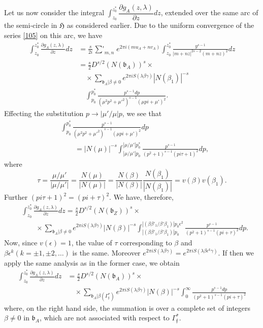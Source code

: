 Let us now consider the integral
$\int^{z^{\ast}_{0}}_{z_{0}}\dfrac{\partial g_{A}(z,\lambda)}{\partial
  z}dz$, extended over the same arc of the semi-circle in
$\mathfrak{H}$ as considered earlier. Due to the uniform convergence
of the series \eqref{105} on this arc, we have  
\begin{align*}
\int^{z^{\ast}_{0}}_{z_{0}}\frac{\partial g_{A}(z,\lambda)}{\partial
  z}dz &= \frac{s}{2i}\mathop{{\sum}'}_{m,n}e^{2\pi
  i(mu_{A}+nv_{A})}\int^{z^{\ast}_{0}}_{z_{0}}\frac{y^{s-1}}{|m+nz|^{2s-2}(m+nz)^{2}}dz\\
&= \frac{s}{2}D^{s/2}(N(\mathfrak{b}_{A}))^{s}\times\\
&\quad \times \sum_{\mathfrak{b}_{A}|\beta\neq 0}e^{2\pi
  iS(\lambda\beta\gamma)}|N(\beta_{1})|^{-s}\\
&\quad\int^{p^{\ast}_{0}}_{p_{0}}\frac{p^{s-1}dp}{(\mu^{2}p^{2}+{\mu'}^{2})^{s-1}(\mu
  pi+{\mu'})^{2}}. 
\end{align*}
Effecting the substitution $p\to |\mu'/\mu|p$, we see that
\begin{align*}
& \int^{p^{\ast}_{0}}_{p_{0}}\frac{p^{s-1}}{(\mu^{2}p^{2}+{\mu'}^{2})^{s-1}(\mu pi+\mu')^{2}}dp\\
&\qquad
  =|N(\mu)|^{-s}\int^{|\mu/\mu'|p^{\ast}_{0}}_{|\mu/\mu'|p_{0}}\frac{p^{s-1}}{(p^{2}+1)^{s-1}(pi\tau+1)^{2}}dp, 
\end{align*}
where 
$$
\tau=\frac{\mu/\mu'}{|\mu/\mu'|}=\frac{N(\mu)}{|N(\mu)|}=\frac{N(\beta)}{|N(\beta)|}\frac{N(\beta_{1})}{|N(\beta_{1})|}=v(\beta)v(\beta_{1}). 
$$
Further $(pi \tau+1)^{2}=(pi+\tau)^{2}$. We have, therefore,
\begin{align*}
& \int^{z^{\ast}_{0}}_{z_{0}}\frac{\partial g_{A}(z,\lambda)}{\partial
  z}dz=\frac{s}{2}D^{s/2}(N(\mathfrak{b}_{Z}))^{s}\times \\
&\qquad \times\sum_{\mathfrak{b}_{A}|\beta\neq 0}e^{2\pi
    iS(\lambda\beta\gamma)}|N(\beta)|^{-s}\int^{|(\beta\beta'_{1}/\beta'\beta_{1})|p_{0}\epsilon^{2}}_{|(\beta\beta'_{1}/\beta'\beta_{1})|p_{0}}\frac{p^{s-1}}{(p^{2}+1)^{s-1}(pi+\tau)^{2}}dp. 
\end{align*}\pageoriginale
Now, since $v(\epsilon)=1$, the value of $\tau$ corresponding to
$\beta$ and $\beta\epsilon^{k}(k=\pm 1,\pm 2,\ldots)$ is the
same. Moreover $e^{2\pi iS(\lambda\beta\gamma)}=e^{2\pi
  iS(\lambda\beta\epsilon^{k}\gamma)}$. If then we apply the same
analysis as in the former case, we obtain 
\begin{align*}
\int^{z^{\ast}_{0}}_{z_{0}}\frac{\partial g_{A}(z,\lambda)}{\partial
  z}dz &= \frac{s}{2}D^{s/2}(N(\mathfrak{b}_{A}))^{s}\times\\
&\quad \times
\sum_{\mathfrak{b}_{A}|\beta(\Gamma^{\ast}_{\mathfrak{f}})}e^{2\pi
  iS(\lambda\beta\gamma)}|N(\beta)|^{-s}\int^{\infty}_{0}\frac{p^{s-1}dp}{(p^{2}+1)^{s-1}(pi+\tau)^{2}}\tag{106}\label{106} 
\end{align*}
where, on the right hand side, the summation is over a complete set of
integers $\beta\neq 0$ in $\mathfrak{b}_{A}$, which are not associated
with respect to $\Gamma^{\ast}_{\mathfrak{f}}$. 

